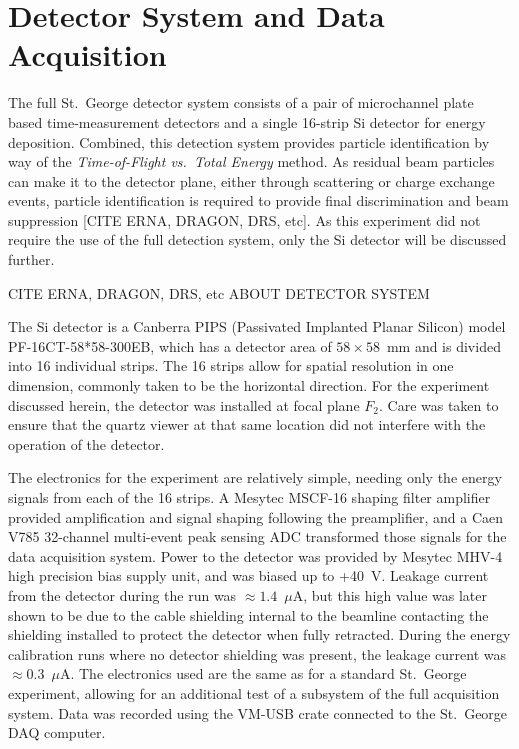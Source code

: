 \section{Detector System and Data Acquisition}
\label{sec:detector}

The full St.\ George detector system consists of a pair of microchannel
plate based time-measurement detectors and a single 16-strip Si detector
for energy deposition. Combined, this detection system provides particle
identification by way of the \textit{Time\--{}of\--{}Flight vs.\ Total Energy}
method. As residual beam particles can make it to the detector plane,
either through scattering or charge exchange events, particle
identification is required to provide final discrimination and beam
suppression
[CITE ERNA, DRAGON, DRS, etc].
As this experiment did not
require the use of the full detection system, only the Si detector will
be discussed further.

CITE ERNA, DRAGON, DRS, etc ABOUT DETECTOR SYSTEM

The Si detector is a Canberra PIPS (Passivated Implanted Planar Silicon)
model PF-16CT-58*58-300EB, which has a detector area of $58\times 58$~mm
and is divided into 16 individual strips. The 16 strips allow for
spatial resolution in one dimension, commonly taken to be the horizontal
direction. For the experiment discussed herein, the detector was
installed at focal plane $F_2$. Care was taken to ensure that the quartz
viewer at that same location did not interfere with the operation of the
detector.

The electronics for the experiment are relatively simple, needing only
the energy signals from each of the 16 strips. A Mesytec MSCF-16 shaping
filter amplifier provided amplification and signal shaping following the
preamplifier, and a Caen V785 32-channel multi-event peak sensing ADC
transformed those signals for the data acquisition system. Power to the
detector was provided by Mesytec MHV-4 high precision bias supply unit,
and was biased up to +40~V. Leakage current from the detector during the
run was $\approx 1.4$~$\mu$A, but this high value was later shown to be
due to the cable shielding internal to the beamline contacting the
shielding installed to protect the detector when fully retracted. During
the energy calibration runs where no detector shielding was present, the
leakage current was $\approx 0.3$~$\mu$A. The electronics used are the
same as for a standard St.\ George experiment, allowing for an
additional test of a subsystem of the full acquisition system. Data was
recorded using the VM-USB crate connected to the St.\ George DAQ
computer.


